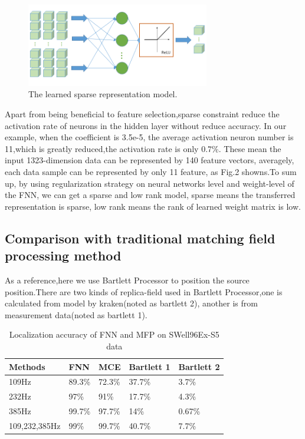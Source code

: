 
\begin{figure}
\includegraphics[width=8cm]{figure/sparse_represention_model}
\caption{The learned sparse representation model.}
\end{figure}

Apart from being beneficial to feature selection,sparse constraint reduce the activation rate of neurons in the hidden layer without reduce accuracy. In our example, when the coefficient is 3.5e-5, the average activation neuron number is 11,which is greatly reduced,the activation rate is only 0.7{\%}.
These mean the input 1323-dimension data can be represented by 140 feature vectors, averagely, each data sample can be represented by only 11 feature, as Fig.2 showns.To sum up, by using regularization strategy on neural networks level and weight-level of the FNN, we can get a sparse and low rank model, sparse means the transferred representation is sparse, low rank means the rank of learned weight matrix is low.

\subsection{Comparison with traditional matching field processing method}
As a reference,here we use Bartlett Processor to position the source position.There are two kinds of replica-field used in Bartlett Processor,one is calculated from model by kraken(noted as bartlett 2), another is from measurement data(noted as bartlett 1).
\begin{table}[]
\caption{Localization accuracy of FNN and MFP on SWell96Ex-S5 data}
\label{my-label}
\begin{tabular}{@{}lllll@{}}
\toprule
Methods       & FNN    & MCE    & Bartlett 1 & Bartlett 2 \\ \midrule
109Hz         & 89.3\% & 72.3\% & 37.7\%     & 3.7\%      \\
232Hz         & 97\%   & 91\%   & 17.7\%     & 4.3\%      \\
385Hz         & 99.7\% & 97.7\% & 14\%       & 0.67\%     \\
109,232,385Hz & 99\%   & 99.7\% & 40.7\%     & 7.7\%      \\ \bottomrule
\end{tabular}
\end{table}

